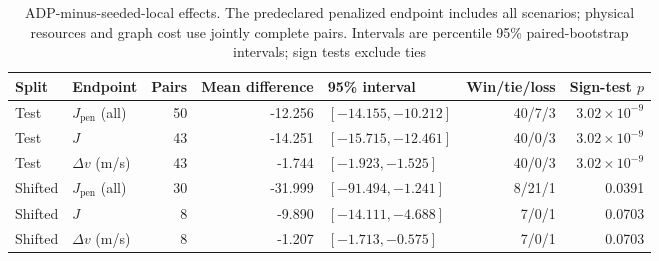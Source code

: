\begin{table}[t]
  \centering
  \caption{ADP-minus-seeded-local effects. The predeclared penalized endpoint includes all scenarios; physical resources and graph cost use jointly complete pairs. Intervals are percentile 95\% paired-bootstrap intervals; sign tests exclude ties}
  \label{tab:required-paired}
  \renewcommand{\arraystretch}{1.08}
  \setlength{\tabcolsep}{5pt}
  \footnotesize
  \begin{tabular*}{\linewidth}{@{\extracolsep{\fill}}llrrlrr@{}}
    \toprule
    Split & Endpoint & Pairs & Mean difference & 95\% interval & Win/tie/loss & Sign-test $p$ \\
    \midrule
    Test & $J_{\mathrm{pen}}$ (all) & 50 & -12.256 & $[-14.155,-10.212]$ & 40/7/3 & $3.02\times10^{-9}$ \\
    Test & $J$ & 43 & -14.251 & $[-15.715,-12.461]$ & 40/0/3 & $3.02\times10^{-9}$ \\
    Test & $\Delta v$ (m/s) & 43 & -1.744 & $[-1.923,-1.525]$ & 40/0/3 & $3.02\times10^{-9}$ \\
    Shifted & $J_{\mathrm{pen}}$ (all) & 30 & -31.999 & $[-91.494,-1.241]$ & 8/21/1 & 0.0391 \\
    Shifted & $J$ & 8 & -9.890 & $[-14.111,-4.688]$ & 7/0/1 & 0.0703 \\
    Shifted & $\Delta v$ (m/s) & 8 & -1.207 & $[-1.713,-0.575]$ & 7/0/1 & 0.0703 \\
    \bottomrule
  \end{tabular*}
\end{table}
